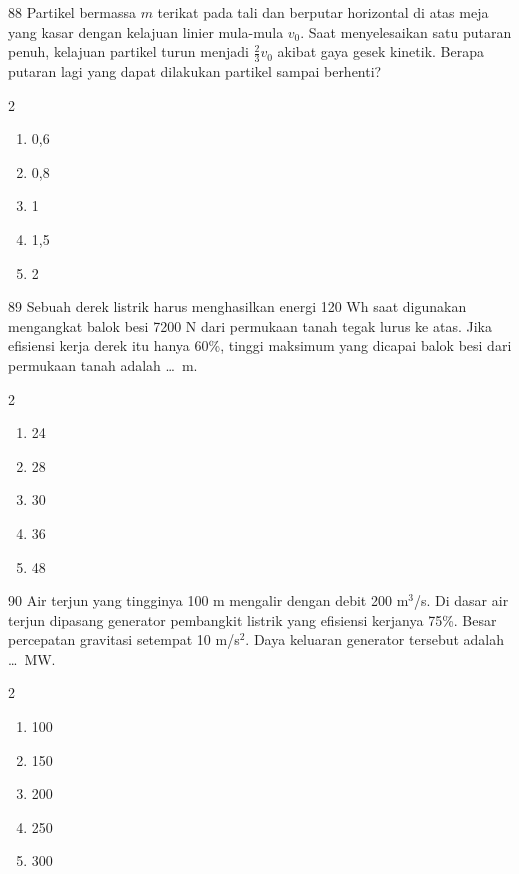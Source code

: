 \documentclass[11pt]{article}
\newenvironment{pilB}{%
  \par\smallskip\begin{multicols}{2}
  \begin{enumerate}[label=(\Alph*),leftmargin=*,itemsep=1pt,topsep=3pt]}%
  {\end{enumerate}\end{multicols}}
\begin{document}
\begin{soal}{88}
Partikel bermassa $m$ terikat pada tali dan berputar horizontal di atas
meja yang kasar dengan kelajuan linier mula-mula $v_0$. Saat
menyelesaikan satu putaran penuh, kelajuan partikel turun menjadi
$\tfrac{2}{3}v_0$ akibat gaya gesek kinetik. Berapa putaran lagi yang
dapat dilakukan partikel sampai berhenti?
\begin{pilB}
  \item 0,6 \item 0,8 \item 1 \item 1,5 \item 2
\end{pilB}
\end{soal}

\begin{soal}{89}
Sebuah derek listrik harus menghasilkan energi 120 Wh saat digunakan
mengangkat balok besi 7200 N dari permukaan tanah tegak lurus ke atas.
Jika efisiensi kerja derek itu hanya 60\%, tinggi maksimum yang dicapai
balok besi dari permukaan tanah adalah \ldots\ m.
\begin{pilB}
  \item 24 \item 28 \item 30 \item 36 \item 48
\end{pilB}
\end{soal}

\begin{soal}{90}
Air terjun yang tingginya 100 m mengalir dengan debit 200 m$^3$/s. Di
dasar air terjun dipasang generator pembangkit listrik yang efisiensi
kerjanya 75\%. Besar percepatan gravitasi setempat 10 m/s$^2$. Daya
keluaran generator tersebut adalah \ldots\ MW.
\begin{pilB}
  \item 100 \item 150 \item 200 \item 250 \item 300
\end{pilB}
\end{soal}
\end{document}
